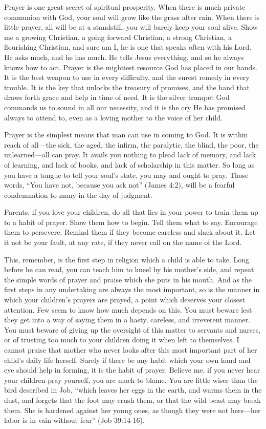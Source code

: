 \documentclass[
]{book}
\begin{document}
Prayer is one great secret of spiritual prosperity. When there is much private communion with God, your soul will grow like the grass after rain. When there is little prayer, all will be at a standstill, you will barely keep your soul alive. Show me a growing Christian, a going forward Christian, a strong Christian, a flourishing Christian, and sure am I, he is one that speaks often with his Lord. He asks much, and he has much. He tells Jesus everything, and so he always knows how to act. Prayer is the mightiest resource God has placed in our hands. It is the best weapon to use in every difficulty, and the surest remedy in every trouble. It is the key that unlocks the treasury of promises, and the hand that draws forth grace and help in time of need. It is the silver trumpet God commands us to sound in all our necessity, and it is the cry He has promised always to attend to, even as a loving mother to the voice of her child.

Prayer is the simplest means that man can use in coming to God. It is within reach of all---the sick, the aged, the infirm, the paralytic, the blind, the poor, the unlearned---all can pray. It avails you nothing to plead lack of memory, and lack of learning, and lack of books, and lack of scholarship in this matter. So long as you have a tongue to tell your soul's state, you may and ought to pray. Those words, ``You have not, because you ask not'' (James 4:2), will be a fearful condemnation to many in the day of judgment.

Parents, if you love your children, do all that lies in your power to train them up to a habit of prayer. Show them how to begin. Tell them what to say. Encourage them to persevere. Remind them if they become careless and slack about it. Let it not be your fault, at any rate, if they never call on the name of the Lord.

This, remember, is the first step in religion which a child is able to take. Long before he can read, you can teach him to kneel by his mother's side, and repeat the simple words of prayer and praise which she puts in his mouth. And as the first steps in any undertaking are always the most important, so is the manner in which your children's prayers are prayed, a point which deserves your closest attention. Few seem to know how much depends on this. You must beware lest they get into a way of saying them in a hasty, careless, and irreverent manner. You must beware of giving up the oversight of this matter to servants and nurses, or of trusting too much to your children doing it when left to themselves. I cannot praise that mother who never looks after this most important part of her child's daily life herself. Surely if there be any habit which your own hand and eye should help in forming, it is the habit of prayer. Believe me, if you never hear your children pray yourself, you are much to blame. You are little wiser than the bird described in Job, ``which leaves her eggs in the earth, and warms them in the dust, and forgets that the foot may crush them, or that the wild beast may break them. She is hardened against her young ones, as though they were not hers---her labor is in vain without fear'' (Job 39:14-16).
\end{document}
